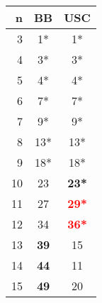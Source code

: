 \begin{table}[t]\scriptsize
\begin{tabular}{r|c|c}
 \hline
 n&BB &USC\\
 \hline
 3&1*&1*\\
 4&3*&3*\\
 5&4*&4*\\
 6&7*&7*\\
 7&9*&9*\\
 8&13*&13*\\
 9&18*&18*\\
 10&23&\textbf{23*}\\
 11&27&\textbf{\textcolor{red}{29*}}\\
 12&34&\textbf{\textcolor{red}{36*}}\\
 13&\textbf{39}&15\\
 14&\textbf{44}&11\\
 15&\textbf{49}&20\\
\end{tabular}
\end{table}
